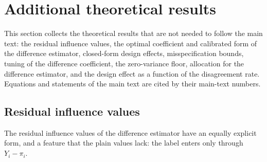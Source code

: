\documentclass[pdflatex,sn-mathphys-num,iicol]{sn-jnl}
\makeatletter
\theoremstyle{thmstyleone}
\theoremstyle{thmstyletwo}
\theoremstyle{thmstylethree}
\newcommand{\Mref}[1]{\ifcsname mref@#1\endcsname\csname mref@#1\endcsname\else\textbf{??}\fi}
\makeatother
\begin{document}
\section{Additional theoretical results}\label{si:theory-extra}

This section collects the theoretical results that are not needed to follow the main text: the residual influence values, the
optimal coefficient and calibrated form of the difference estimator, closed-form design effects, misspecification bounds,
tuning of the difference coefficient, the zero-variance floor, allocation for the difference estimator, and the design effect as
a function of the disagreement rate. Equations and statements of the main text are cited by their main-text numbers.

\subsection{Residual influence values}\label{si:theory-resid}

The residual influence values of the difference estimator have an equally explicit form, and a
feature that the plain values lack: the label enters only through $Y_i-\pi_i$.
\end{document}
